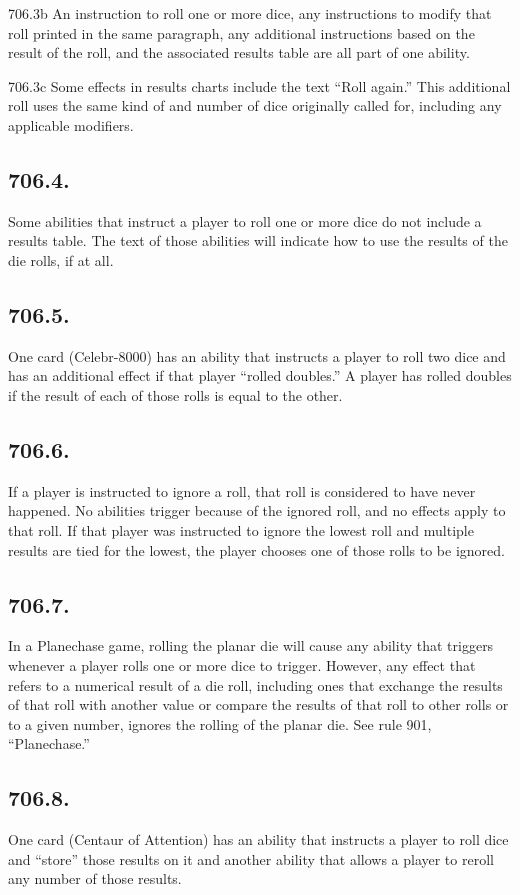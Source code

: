 706.3b An instruction to roll one or more dice, any instructions to modify that roll printed in the same paragraph, any additional instructions based on the result of the roll, and the associated results table are all part of one ability.

706.3c Some effects in results charts include the text “Roll again.” This additional roll uses the same kind of and number of dice originally called for, including any applicable modifiers.

\subsection*{706.4.}
Some abilities that instruct a player to roll one or more dice do not include a results table. The text of those abilities will indicate how to use the results of the die rolls, if at all.

\subsection*{706.5.}
One card (Celebr-8000) has an ability that instructs a player to roll two dice and has an additional effect if that player “rolled doubles.” A player has rolled doubles if the result of each of those rolls is equal to the other.

\subsection*{706.6.}
If a player is instructed to ignore a roll, that roll is considered to have never happened. No abilities trigger because of the ignored roll, and no effects apply to that roll. If that player was instructed to ignore the lowest roll and multiple results are tied for the lowest, the player chooses one of those rolls to be ignored.

\subsection*{706.7.}
In a Planechase game, rolling the planar die will cause any ability that triggers whenever a player rolls one or more dice to trigger. However, any effect that refers to a numerical result of a die roll, including ones that exchange the results of that roll with another value or compare the results of that roll to other rolls or to a given number, ignores the rolling of the planar die. See rule 901, “Planechase.”

\subsection*{706.8.}
One card (Centaur of Attention) has an ability that instructs a player to roll dice and “store” those results on it and another ability that allows a player to reroll any number of those results.

